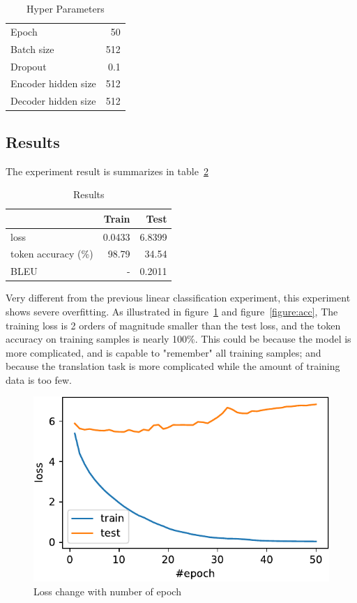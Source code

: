 \documentclass[journal, a4paper]{IEEEtran}
\begin{document}
\begin{table}[htb]
    \centering
    \caption{Hyper Parameters}
    \label{table:hyper-param}
    \begin{tabular}{l|r}
        \hline
        Epoch         & 50  \\
        Batch size    & 512 \\
        Dropout       & 0.1 \\
        Encoder hidden size & 512 \\
        Decoder hidden size & 512 \\
        \hline
    \end{tabular}
\end{table}

\subsection{Results}

The experiment result is summarizes in table~\ref{table:results}

\begin{table}[htb]
    \centering
    \caption{Results}
    \label{table:results}
    \begin{tabular}{l|rr}
        \hline
                    & Train  & Test \\
        \hline
        loss        & 0.0433 & 6.8399 \\
        token accuracy (\%) & 98.79 & 34.54  \\
        BLEU        & -      & 0.2011
    \end{tabular}
\end{table}

Very different from the previous linear classification experiment, this experiment shows severe overfitting. As illustrated in figure~\ref{figure:loss} and figure~\ref{figure:acc}, The training loss is 2 orders of magnitude smaller than the test loss, and the token accuracy on training samples is nearly 100\%. This could be because the model is more complicated, and is capable to "remember" all training samples; and because the translation task is more complicated while the amount of training data is too few.

\begin{figure}
    \includegraphics[width=\linewidth]{figures/loss.pdf}
    \caption{Loss change with number of epoch}
    \label{figure:loss}
\end{figure}
\end{document}
